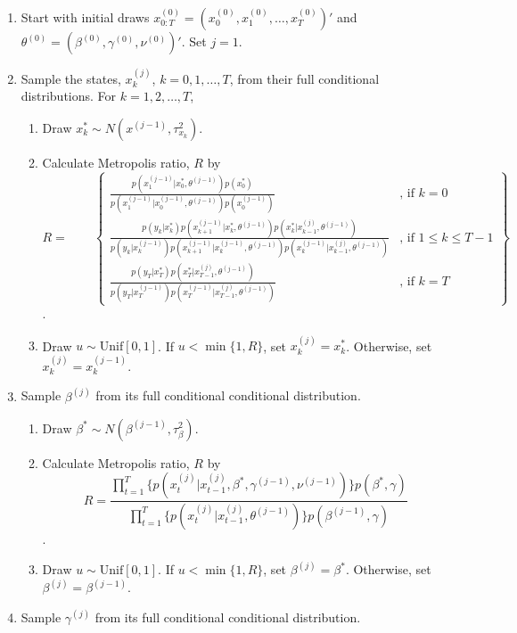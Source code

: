 \documentclass{article}
\begin{document}
\begin{enumerate}
\item Start with initial draws $x^{(0)}_{0:T} = (x^{(0)}_0, x^{(0)}_1, \ldots, x^{(0)}_T)'$ and $\theta^{(0)} = (\beta^{(0)}, \gamma^{(0)}, \nu^{(0)})'$. Set $j = 1$.
\item \label{step:gibbs} Sample the states, $x^{(j)}_k$, $k = 0,1,\ldots,T$, from their full conditional distributions. For $k = 1, 2, \ldots, T$,
    \begin{enumerate}[label=\alph*.,leftmargin=1.75\parindent]
    \item Draw $x^*_k \sim N(x^{(j-1)},\tau^2_{x_k})$.
    \item Calculate Metropolis ratio, $R$ by
    \[R = \qquad \left\{
    \begin{array}{cc}
    \frac{p(x^{(j-1)}_1|x^*_0,\theta^{(j-1)})p(x^*_0)}{p(x^{(j-1)}_1|x^{(j-1)}_0,\theta^{(j-1)})p(x^{(j-1)}_0)} & \mbox{, if } k = 0 \\
    \frac{p(y_k|x^*_k)p(x^{(j-1)}_{k+1}|x^*_k,\theta^{(j-1)})p(x^*_k|x^{(j)}_{k-1},\theta^{(j-1)})}{p(y_k|x^{(j-1)}_k)p(x^{(j-1)}_{k+1}|x^{(j-1)}_k,\theta^{(j-1)})p(x^{(j-1)}_k|x^{(j)}_{k-1},\theta^{(j-1)})} & \mbox{, if } 1 \le k \le T-1 \\
        \frac{p(y_T|x^*_T)p(x^*_T|x^{(j)}_{T-1},\theta^{(j-1)})}{p(y_T|x^{(j-1)}_T)p(x^{(j-1)}_T|x^{(j)}_{T-1},\theta^{(j-1)})}  & \mbox{, if } k = T
    \end{array}
    \right\}\].
    \item Draw $u \sim \mbox{Unif}[0,1]$. If $u < \min\{1, R\}$, set $x^{(j)}_k = x^*_k$. Otherwise, set $x^{(j)}_k = x^{(j-1)}_k$.
    \end{enumerate}
\item Sample $\beta^{(j)}$ from its full conditional conditional distribution.
    \begin{enumerate}[label=\alph*.,leftmargin=1.75\parindent]
    \item Draw $\beta^* \sim N(\beta^{(j-1)},\tau^2_{\beta})$.
    \item Calculate Metropolis ratio, $R$ by
    \[R = \frac{\prod_{t=1}^T \{p(x^{(j)}_t|x^{(j)}_{t-1},\beta^*,\gamma^{(j-1)},\nu^{(j-1)})\}p(\beta^*,\gamma)}{\prod_{t=1}^T \{p(x^{(j)}_t|x^{(j)}_{t-1},\theta^{(j-1)})\}p(\beta^{(j-1)},\gamma)}\].
    \item Draw $u \sim \mbox{Unif}[0,1]$. If $u < \min\{1, R\}$, set $\beta^{(j)} = \beta^*$. Otherwise, set $\beta^{(j)} = \beta^{(j-1)}$.
    \end{enumerate}
\item Sample $\gamma^{(j)}$ from its full conditional conditional distribution.

\end{enumerate}
\end{document}
